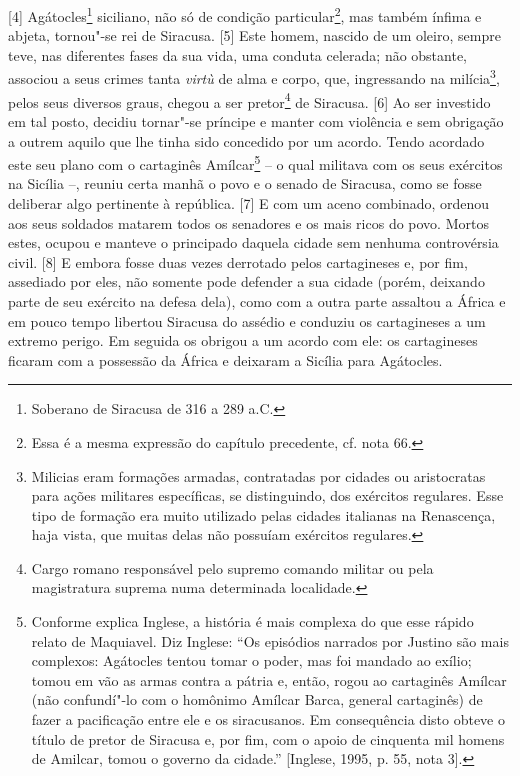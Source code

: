 {[}4{]} Agátocles\footnote{Soberano de Siracusa de 316 a 289 a.C.}
siciliano, não só de condição particular\footnote{Essa é a mesma
  expressão do capítulo precedente, cf. nota 66.}, mas também ínfima e
abjeta, tornou"-se rei de Siracusa. {[}5{]} Este homem, nascido de um
oleiro, sempre teve, nas diferentes fases da sua vida, uma conduta
celerada; não obstante, associou a seus crimes tanta \emph{virtù} de
alma e corpo, que, ingressando na milícia\footnote{Milicias eram
  formações armadas, contratadas por cidades ou aristocratas para ações
  militares específicas, se distinguindo, dos exércitos regulares. Esse
  tipo de formação era muito utilizado pelas cidades italianas na
  Renascença, haja vista, que muitas delas não possuíam exércitos
  regulares.}, pelos seus diversos graus, chegou a ser pretor\footnote{Cargo
  romano responsável pelo supremo comando militar ou pela magistratura
  suprema numa determinada localidade.} de Siracusa. {[}6{]} Ao ser
investido em tal posto, decidiu tornar"-se príncipe e manter com
violência e sem obrigação a outrem aquilo que lhe tinha sido concedido
por um acordo. Tendo acordado este seu plano com o cartaginês
Amílcar\footnote{Conforme explica Inglese, a história é mais complexa do
  que esse rápido relato de Maquiavel. Diz Inglese: ``Os episódios
  narrados por Justino são mais complexos: Agátocles tentou tomar o
  poder, mas foi mandado ao exílio; tomou em vão as armas contra a
  pátria e, então, rogou ao cartaginês Amílcar (não confundí"-lo com o
  homônimo Amílcar Barca, general cartaginês) de fazer a pacificação
  entre ele e os siracusanos. Em consequência disto obteve o título de
  pretor de Siracusa e, por fim, com o apoio de cinquenta mil homens de
  Amilcar, tomou o governo da cidade.'' {[}Inglese, 1995, p. 55, nota
  3{]}.} -- o qual militava com os seus exércitos na Sicília --, reuniu
certa manhã o povo e o senado de Siracusa, como se fosse deliberar algo
pertinente à república. {[}7{]} E com um aceno combinado, ordenou aos
seus soldados matarem todos os senadores e os mais ricos do povo. Mortos
estes, ocupou e manteve o principado daquela cidade sem nenhuma
controvérsia civil. {[}8{]} E embora fosse duas vezes derrotado pelos
cartagineses e, por fim, assediado por eles, não somente pode defender a
sua cidade (porém, deixando parte de seu exército na defesa dela), como
com a outra parte assaltou a África e em pouco tempo libertou Siracusa
do assédio e conduziu os cartagineses a um extremo perigo. Em seguida os
obrigou a um acordo com ele: os cartagineses ficaram com a possessão da
África e deixaram a Sicília para Agátocles.

